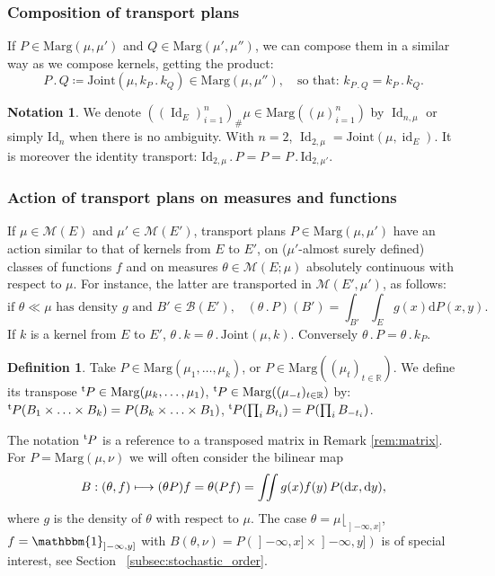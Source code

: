 \documentclass[JEP,XML,SOM,Unicode,NoEqCountersInSection,NoFloatCountersInSection,published]{cedram}
\newcommand{\ldot}{\mathbin{.}}
\newcommand\mto{\mathchoice{\longmapsto}{\mapsto}{\mapsto}{\mapsto}}
\theoremstyle{plain}
\theoremstyle{definition}
\newtheorem{defi}[them]{Definition}
\newtheorem{notation}[them]{Notation} %
\newcommand{\dd}{\mathrm{d}}
\newcommand{\id}{\mathrm{Id}}
\newcommand{\join}{\mathrm{Joint}}
\newcommand{\idk}{\operatorname{id}}
\newcommand{\Id}{\operatorname{Id}}
\newcommand{\one}{\mathbbm{1}}
\newcommand{\trans}{{}^{\mathrm{t}}\mkern-1mu}
\newcommand{\eqdefup}{\coloneqq}
\newcommand{\m}{\mathcal{M}}
\newcommand{\ma}{\mathrm{Marg}}
\newcommand{\R}{\mathbb{R}}
\newcommand{\op}{\mathopen}
\begin{document}
\subsubsection{Composition of transport plans}\label{subsubsec:composition} If $P\in\ma(\mu,\mu')$ and $Q\in\ma(\mu',\mu'')$, we can compose them in a similar way as we compose kernels, getting the product:\vspace*{-3pt}
\[P\ldot Q\eqdefup\join(\mu,k_P\ldot k_Q)\in\ma(\mu,\mu''),\quad \text{so that: }k_{P\ldot Q}=k_P\ldot k_Q.\]

\begin{notation}\label{notation:transport_id}
We denote $((\Id_E)_{i=1}^n)_\#\mu\in\ma((\mu)_{i=1}^n)$ by $\Id_{n,\mu}$ or simply $\id_n$ when there is no ambiguity. With $n=2$, $\Id_{2,\mu}=\join(\mu,\idk_E)$. It is moreover the identity transport: $\id_{2,\mu}{}\ldot P=P=P\ldot \id_{2,\mu'}$.
\end{notation}

\subsubsection{Action of transport plans on measures and functions}\label{subsubsec:action_des_transports} If $\mu\in\m(E)$ and $\mu'\in\m(E')$, transport plans $P\in\ma(\mu,\mu')$ have an action similar to that of kernels from $E$ to $E'$, on ($\mu'$-almost surely defined) classes of functions $f$ and on measures $\theta\in\m(E;\mu)$ absolutely continuous with respect to $\mu$. For instance, the latter are transported in $\m(E',\mu')$, as follows:
\[\text{if $\theta\ll \mu$ has density $g$ and $B'\in{\mathcal B}(E')$,}\quad(\theta\ldot P)(B')=\int_{B'}\int_E g(x)\dd P(x,y).\]
If $k$ is a kernel from $E$ to $E'$, $\theta\ldot k=\theta\ldot \join(\mu,k)$. Conversely $\theta\ldot P=\theta\ldot k_P$.

\begin{defi}\label{defi:transpose} Take $P\in\ma(\mu_1,\ldots,\mu_k)$, or $P\in\ma((\mu_t)_{t\in\R})$. We define its transpose $\trans P\in\ma(\mu_k,\ldots,\mu_1)$, \resp $\trans P\in\ma((\mu_{-t})_{t\in\R})$ by: $ \trans P(B_1\times \ldots\times B_k)=P(B_k\times\ldots\times B_1)$, \resp $\trans P(\prod_iB_{t_i})=P(\prod_iB_{-t_i})$.
\end{defi}

The notation $\trans P$ is a reference to a transposed matrix in Remark \ref{rem:matrix}. For $P=\ma(\mu,\nu)$ we will often consider the bilinear map
\[B:(\theta,f)\mto (\theta P)f=\theta (Pf)=\iint g(x)f(y)\,P(\dd x,\dd y),\]
where $g$ is the density of $\theta$ with respect to $\mu$. The case $\theta=\mu\lfloor_{\op]-\infty,x]}$, $f=\one_{\op]-\infty,y]}$ with $B(\theta,\nu)=P(\op]-\infty,x]\times\op]-\infty,y])$ is of special interest, see Section~ \ref{subsec:stochastic_order}.
\end{document}
